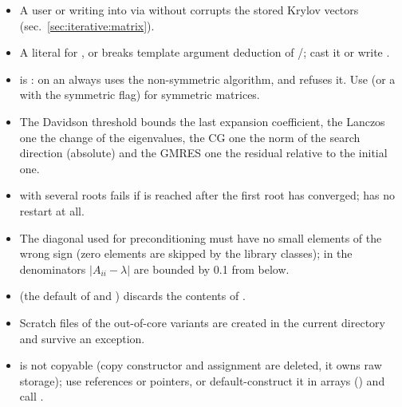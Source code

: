 \begin{itemize}
\item A user  or  writing into  via  without 
corrupts the stored Krylov vectors (sec.~\ref{sec:iterative:matrix}).
\item A literal  for ,  or  breaks template argument deduction of
/; cast it or write .
\item {} is :  on an  always uses the non-symmetric algorithm, and
 refuses it. Use  (or a  with the symmetric flag) for symmetric matrices.
\item The Davidson threshold  bounds the last expansion coefficient, the Lanczos one the change of the eigenvalues,
the CG one the norm of the search direction (absolute) and the GMRES one the residual relative to the initial one.
\item {} with several roots fails if  is reached after the first root has converged; 
has no restart at all.
\item The diagonal used for preconditioning must have no small elements of the wrong sign (zero elements are skipped by the
library classes); in  the denominators $|A_{ii}-\lambda|$ are bounded by 0.1 from below.
\item {} (the default of  and ) discards the contents of .
\item Scratch files of the out-of-core variants are created in the current directory and survive an exception.
\item {} is not copyable (copy constructor and assignment are deleted, it owns raw storage); use references or pointers,
or default-construct it in arrays () and call .
\end{itemize}
